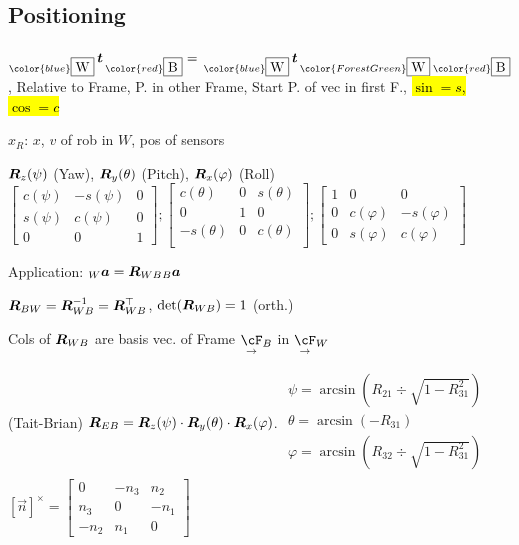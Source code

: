 \subsection{Positioning}
$_{\color{blue}\fbox{W}}\,\vec{t}\,_{\color{red}\fbox{B}} = \, _{\color{blue}\fbox{W}}\,\vec{t}\,_{\color{ForestGreen}\fbox{W}}\,_{\color{red}\fbox{B}}$,
{\color{blue} Relative to Frame}, {\color{red} P. in other Frame}, {\color{ForestGreen} Start P. of vec in first F.},
\hl{$\sin = s$, $\cos = c$}

 $x_R$: $x$, $v$ of rob in $W$, pos of sensors

$\bm{R}_{z}(\psi)$ (Yaw),
$\bm{R}_y(\theta)$ (Pitch),
$\bm{R}_x(\varphi)$ (Roll)\\
{\scriptsize
$\begin{bmatrix}
        c(\psi) & -s(\psi) & 0 \\
        s(\psi) & c(\psi)  & 0 \\
        0       & 0        & 1
    \end{bmatrix};
    \begin{bmatrix}
        c(\theta)  & 0 & s(\theta) \\
        0          & 1 & 0         \\
        -s(\theta) & 0 & c(\theta) \\
    \end{bmatrix};
    \begin{bmatrix}
        1 & 0          & 0           \\
        0 & c(\varphi) & -s(\varphi) \\
        0 & s(\varphi) & c(\varphi)
    \end{bmatrix}$
}

\shortremark Application: ${_W} \bm{a} = \bm{R}_{WB} {_B} \bm{a}$

\shortlemma $\bm{R}_{BW} = \bm{R}_{WB}^{-1} = \bm{R}_{WB}^\top$, $\det(\bm{R}_{WB}) = 1$ (orth.)

\shortremark Cols of $\bm{R}_{WB}$ are basis vec. of Frame $\underset{\rightarrow}{\cF}{_B}$ in $\underset{\rightarrow}{\cF}{_W}$

 (Tait-Brian) $\bm{R}_{EB} = \bm{R}_z(\psi) \cdot \bm{R}_y(\theta) \cdot \bm{R}_x(\varphi)$.
$\begin{smallmatrix}
        \psi = \arcsin\left( R_{21} \div \sqrt{1 - R_{31}^2} \right)\\
        \theta = \arcsin(-R_{31})\\
        \varphi = \arcsin\left( R_{32} \div \sqrt{1 - R_{31}^2} \right)\\
    \end{smallmatrix}$
$[\vec{n}]^\times = \begin{bmatrix}
        0    & -n_3 & n_2  \\
        n_3  & 0    & -n_1 \\
        -n_2 & n_1  & 0
    \end{bmatrix}$

